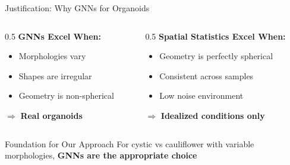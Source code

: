 \documentclass[aspectratio=169]{beamer}
\begin{document}
\begin{frame}{Justification: Why GNNs for Organoids}
    \begin{columns}
        \begin{column}{0.5\textwidth}
            \textbf{GNNs Excel When:}
        \begin{itemize}
                \item Morphologies vary
                \item Shapes are irregular
                \item Geometry is non-spherical
        \end{itemize}
        
            \vspace{0.5em}
            $\Rightarrow$ \textcolor{cysticGreen}{\textbf{Real organoids}}
        \end{column}
        \begin{column}{0.5\textwidth}
            \textbf{Spatial Statistics Excel When:}
        \begin{itemize}
                \item Geometry is perfectly spherical
                \item Consistent across samples
                \item Low noise environment
        \end{itemize}
        
            \vspace{0.5em}
            $\Rightarrow$ \textbf{Idealized conditions only}
        \end{column}
    \end{columns}
    
    \vspace{1em}
    \begin{block}{Foundation for Our Approach}
        For cystic vs cauliflower with variable morphologies, \textbf{GNNs are the appropriate choice}
    \end{block}
\end{frame}
\end{document}
